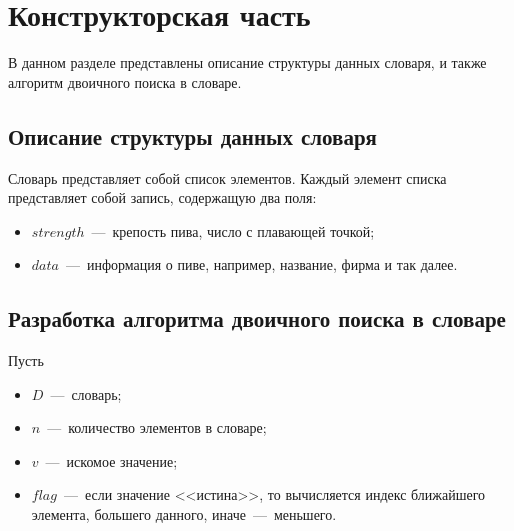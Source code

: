 \chapter{Конструкторская часть}

В данном разделе представлены описание структуры данных словаря, и также алгоритм двоичного поиска в словаре.

\section{Описание структуры данных словаря}
Словарь представляет собой список элементов. Каждый элемент списка представляет собой запись, содержащую два поля:

\begin{itemize}
	\item $strength$~---~крепость пива, число с плавающей точкой;
	\item $data$~---~информация о пиве, например, название, фирма и так далее.
\end{itemize}

\section{Разработка алгоритма двоичного поиска в словаре}
Пусть

\begin{itemize}
	\item $D$~---~словарь;
	\item $n$~---~количество элементов в словаре;
	\item $v$~---~искомое значение;
	\item $flag$~---~если значение <<истина>>, то вычисляется индекс ближайшего элемента, большего данного, иначе~---~меньшего.
\end{itemize}

